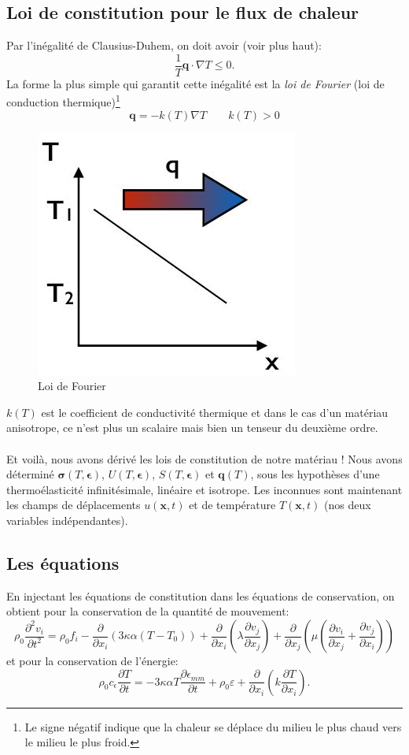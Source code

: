 \subsection{Loi de constitution pour le flux de chaleur}
Par l'inégalité de Clausius-Duhem, on doit avoir (voir plus haut):
$$\frac{1}{T}\textbf{q}\cdot\nabla T\leq 0.$$  La forme la plus simple qui garantit cette inégalité est la \emph{loi de Fourier} (loi de conduction thermique)\footnote{Le signe négatif indique que la chaleur se déplace du milieu le plus chaud vers le milieu le plus froid.}
$$\boxed{\textbf{q}=-k(T)\nabla T} \qquad k(T)>0$$
\begin{figure}[!h]
\centering
\includegraphics[scale=0.6]{./fourier.jpg}
\caption{Loi de Fourier}
\end{figure}
$k(T)$ est le coefficient de conductivité thermique et dans le cas d'un matériau anisotrope, ce n'est plus un scalaire mais bien un tenseur du deuxième ordre. 
\paragraph{}
Et voilà, nous avons dérivé les lois de constitution de notre matériau ! Nous avons déterminé $\boldsymbol{\sigma}(T,\boldsymbol{\epsilon})$, $U(T,\boldsymbol{\epsilon})$, $S(T,\boldsymbol{\epsilon})$ et $\textbf{q}(T)$, sous les hypothèses d'une thermoélasticité infinitésimale, linéaire et isotrope. Les inconnues sont maintenant les champs de déplacements $u(\textbf{x},t)$ et de température $T(\textbf{x},t)$ (nos deux variables indépendantes).
\subsection{Les équations}
En injectant les équations de constitution dans les équations de conservation, on obtient pour la conservation de la quantité de mouvement:
$$\rho_0\frac{\partial^2v_i}{\partial t^2}=\rho_0f_i-\frac{\partial}{\partial x_i}(3\kappa\alpha(T-T_0))+\frac{\partial}{\partial x_i}\left(\lambda\frac{\partial v_j}{\partial x_j}\right)+\frac{\partial}{\partial x_j}\left(\mu\left(\frac{\partial v_i}{\partial x_j}+\frac{\partial v_j}{\partial x_i}\right)\right)$$
et pour la conservation de l'énergie:
$$\rho_0c_\epsilon\frac{\partial T}{\partial t}=-3\kappa\alpha T\frac{\partial\epsilon_{mm}}{\partial t}+\rho_0\varepsilon+\frac{\partial}{\partial x_i}\left(k\frac{\partial T}{\partial x_i}\right).$$
